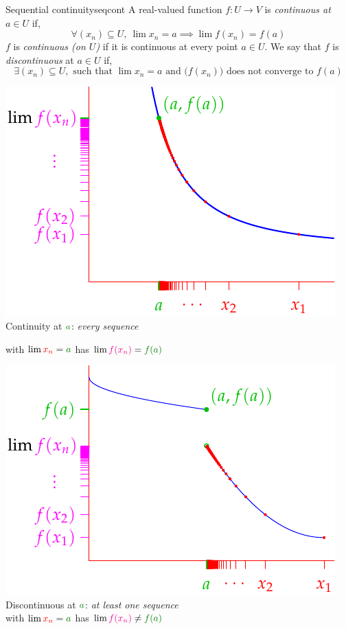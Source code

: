 \begin{defn}{Sequential continuity}{seqcont}
	A real-valued function $f:U\to V$ is \emph{continuous at $a\in U$} if,
	\[
		\forall (x_n)\subseteq U, \
		\lim x_n=a\implies\lim f(x_n)=f(a)
	\]
	$f$ is \emph{continuous (on $U$)} if it is continuous at every point $a\in U$.\smallbreak
	We say that $f$ is \emph{discontinuous} at $a\in U$ if,
	\[
		\exists (x_n)\subseteq U,\text{ such that }\lim x_n=a\text{ and }\bigl(f(x_n)\bigr)\text{ does not converge to $f(a)$}
	\]
	\begin{minipage}[t]{0.49\linewidth}\vspace{0pt}
		\centering
		\includegraphics[scale=0.95]{contdef-pic4}\\
		Continuity at $\textcolor{Green}{a}$: \emph{every sequence}\par
		with $\lim\textcolor{red}{x_n}=\textcolor{Green}{a}$ has $\lim\textcolor{magenta}{f(x_n)}=\textcolor{Green}{f(a)}$
	\end{minipage}
	\hfill
	\begin{minipage}[t]{0.49\linewidth}\vspace{0pt}
		\centering
		\includegraphics[scale=0.95]{contdef-pic2}\\
		Discontinuous at $\textcolor{Green}{a}$: \emph{at least one sequence}\\
		with $\lim\textcolor{red}{x_n}=\textcolor{Green}{a}$ has $\lim\textcolor{magenta}{f(x_n)}\neq \textcolor{Green}{f(a)}$
	\end{minipage}
\end{defn}


